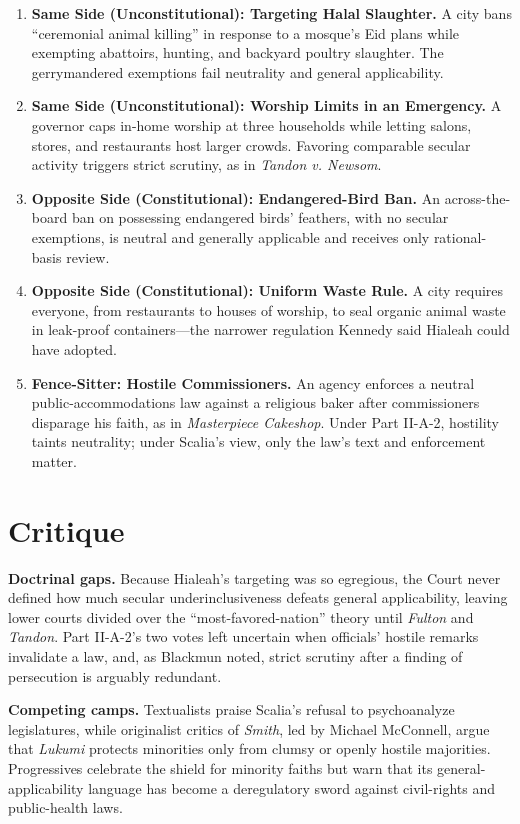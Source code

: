 \documentclass[12pt]{article}
\begin{document}
\begin{enumerate}
\item \textbf{Same Side (Unconstitutional): Targeting Halal Slaughter.} A city bans ``ceremonial animal killing'' in response to a mosque's Eid plans while exempting abattoirs, hunting, and backyard poultry slaughter. The gerrymandered exemptions fail neutrality and general applicability.
\item \textbf{Same Side (Unconstitutional): Worship Limits in an Emergency.} A governor caps in-home worship at three households while letting salons, stores, and restaurants host larger crowds. Favoring comparable secular activity triggers strict scrutiny, as in \textit{Tandon v. Newsom}.
\item \textbf{Opposite Side (Constitutional): Endangered-Bird Ban.} An across-the-board ban on possessing endangered birds' feathers, with no secular exemptions, is neutral and generally applicable and receives only rational-basis review.
\item \textbf{Opposite Side (Constitutional): Uniform Waste Rule.} A city requires everyone, from restaurants to houses of worship, to seal organic animal waste in leak-proof containers---the narrower regulation Kennedy said Hialeah could have adopted.
\item \textbf{Fence-Sitter: Hostile Commissioners.} An agency enforces a neutral public-accommodations law against a religious baker after commissioners disparage his faith, as in \textit{Masterpiece Cakeshop}. Under Part II-A-2, hostility taints neutrality; under Scalia's view, only the law's text and enforcement matter.
\end{enumerate}

\section{Critique}

\textbf{Doctrinal gaps.} Because Hialeah's targeting was so egregious, the Court never defined how much secular underinclusiveness defeats general applicability, leaving lower courts divided over the ``most-favored-nation'' theory until \textit{Fulton} and \textit{Tandon}. Part II-A-2's two votes left uncertain when officials' hostile remarks invalidate a law, and, as Blackmun noted, strict scrutiny after a finding of persecution is arguably redundant.

\textbf{Competing camps.} Textualists praise Scalia's refusal to psychoanalyze legislatures, while originalist critics of \textit{Smith}, led by Michael McConnell, argue that \textit{Lukumi} protects minorities only from clumsy or openly hostile majorities. Progressives celebrate the shield for minority faiths but warn that its general-applicability language has become a deregulatory sword against civil-rights and public-health laws.
\end{document}
